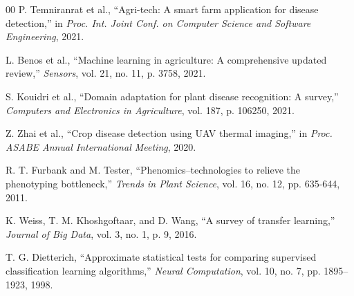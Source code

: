 \documentclass[conference]{IEEEtran}
\begin{document}
\begin{thebibliography}{00}
P. Temniranrat et al., ``Agri-tech: A smart farm application for disease detection,'' in \textit{Proc. Int. Joint Conf. on Computer Science and Software Engineering}, 2021.

L. Benos et al., ``Machine learning in agriculture: A comprehensive updated review,'' \textit{Sensors}, vol. 21, no. 11, p. 3758, 2021.

S. Kouidri et al., ``Domain adaptation for plant disease recognition: A survey,'' \textit{Computers and Electronics in Agriculture}, vol. 187, p. 106250, 2021.

Z. Zhai et al., ``Crop disease detection using UAV thermal imaging,'' in \textit{Proc. ASABE Annual International Meeting}, 2020.

R. T. Furbank and M. Tester, ``Phenomics--technologies to relieve the phenotyping bottleneck,'' \textit{Trends in Plant Science}, vol. 16, no. 12, pp. 635-644, 2011.

K. Weiss, T. M. Khoshgoftaar, and D. Wang, ``A survey of transfer learning,'' \textit{Journal of Big Data}, vol. 3, no. 1, p. 9, 2016.

T. G. Dietterich, ``Approximate statistical tests for comparing supervised classification learning algorithms,'' \textit{Neural Computation}, vol. 10, no. 7, pp. 1895--1923, 1998.

\end{thebibliography}
\end{document}
